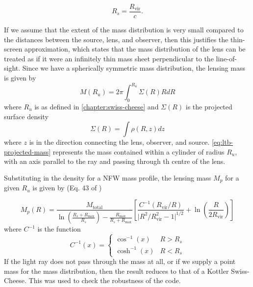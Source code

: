 \begin{equation}
  R_s = \frac{R_{\text{vir}}}{c}.
\end{equation}

If we assume that the extent of the mass distribution is very small compared to the distances between the source, lens, and observer, then this justifies the thin-screen approximation, which states that the mass distribution of the lens can be treated as if it were an infinitely thin mass sheet perpendicular to the line-of-sight. Since we have a spherically symmetric mass distribution, the lensing mass is given by
\begin{equation}
  M(R_u) = 2\pi \int_0^{R_u} \Sigma(R) R dR
  \label{eq:ltb-projected-mass}
\end{equation}
where $R_u$ is as defined in \autoref{chapter:swiss-cheese} and $\Sigma(R)$ is the projected surface density
\begin{equation}
  \Sigma(R) = \int \rho(R, z) dz 
  \label{eq:ltb-projected-surface-density}
\end{equation}
where $z$ is in the direction connecting the lens, observer, and source. \autoref{eq:ltb-projected-mass} represents the mass contained within a cylinder of radius $R_u$, with an axis parallel to the ray and passing through th centre of the lens. 

Substituting in the density for a NFW mass profile, the lensing mass $M_p$ for a given $R_u$ is given by (Eq. 43 of \citet{lokas2001properties})

\begin{equation}
  M_p(R) = \frac{M_{\text{total}}}{\ln\left ( \frac{R_s + R_{\text{max}}}{R_s}\right) - \frac{R_{\text{max}}}{R_s + R_{\text{max}}}} \left [\frac{C^{-1}(R_{\text{vir}}/R)}{\mathopen| R^2/R_{\text{vir}}^2 - 1 \mathclose|^{1/2}} + \ln \left ( \frac{R}{2 R_{\text{vir}}}\right ) \right ]
\end{equation}
where $C^{-1}$ is the function
\begin{equation}
  C^{-1}(x) = 
  \begin{cases}
    \cos^{-1}(x)  & R > R_s\\
    \cosh^{-1}(x) & R < R_s
  \end{cases}
\end{equation}
If the light ray does not pass through the mass at all, or if we supply a point mass for the mass distribution, then the result reduces to that of a Kottler Swiss-Cheese. This was used to check the robustness of the code. 

